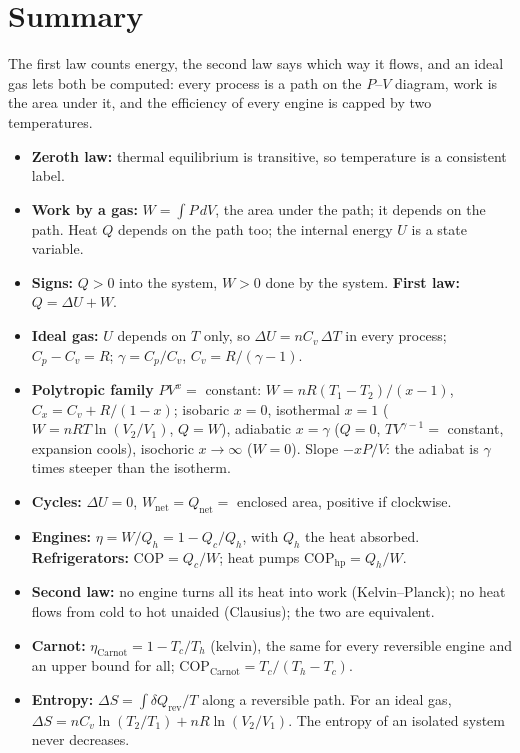 \section{Summary}\label{sec:summary-thermo}

The first law counts energy, the second law says which way it flows, and an ideal gas lets both be
computed: every process is a path on the $P$--$V$ diagram, work is the area under it, and the
efficiency of every engine is capped by two temperatures.

\begin{itemize}
\item \textbf{Zeroth law:} thermal equilibrium is transitive, so temperature is a consistent label.
\item \textbf{Work by a gas:} $W=\int P\,dV$, the area under the path; it depends on the path. Heat $Q$
      depends on the path too; the internal energy $U$ is a state variable.
\item \textbf{Signs:} $Q>0$ into the system, $W>0$ done by the system. \textbf{First law:} $Q=\Delta U+W$.
\item \textbf{Ideal gas:} $U$ depends on $T$ only, so $\Delta U=nC_v\,\Delta T$ in every process;
      $C_p-C_v=R$; $\gamma=C_p/C_v$, $C_v=R/(\gamma-1)$.
\item \textbf{Polytropic family} $PV^x=$ constant: $W=nR(T_1-T_2)/(x-1)$, $C_x=C_v+R/(1-x)$; isobaric $x=0$,
      isothermal $x=1$ ($W=nRT\ln(V_2/V_1)$, $Q=W$), adiabatic $x=\gamma$ ($Q=0$, $TV^{\gamma-1}=$ constant,
      expansion cools), isochoric $x\to\infty$ ($W=0$). Slope $-xP/V$: the adiabat is $\gamma$ times steeper
      than the isotherm.
\item \textbf{Cycles:} $\Delta U=0$, $W_{\text{net}}=Q_{\text{net}}=$ enclosed area, positive if clockwise.
\item \textbf{Engines:} $\eta=W/Q_h=1-Q_c/Q_h$, with $Q_h$ the heat absorbed. \textbf{Refrigerators:}
      $\text{COP}=Q_c/W$; heat pumps $\text{COP}_{\text{hp}}=Q_h/W$.
\item \textbf{Second law:} no engine turns all its heat into work (Kelvin--Planck); no heat flows from cold to
      hot unaided (Clausius); the two are equivalent.
\item \textbf{Carnot:} $\eta_{\text{Carnot}}=1-T_c/T_h$ (kelvin), the same for every reversible engine and an
      upper bound for all; $\text{COP}_{\text{Carnot}}=T_c/(T_h-T_c)$.
\item \textbf{Entropy:} $\Delta S=\int\delta Q_{\text{rev}}/T$ along a reversible path. For an ideal gas,
      $\Delta S=nC_v\ln(T_2/T_1)+nR\ln(V_2/V_1)$. The entropy of an isolated system never decreases.
\end{itemize}

